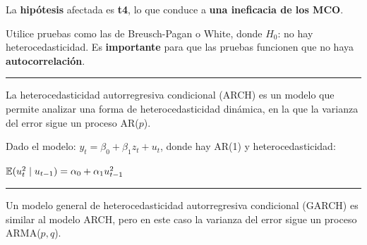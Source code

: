 \begin{f}
	
	La \textbf{hipótesis} afectada es \textbf{t4}, lo que conduce a \textbf{una ineficacia de los MCO}.
	
	Utilice pruebas como las de Breusch-Pagan o White, donde \(H_{0}\): no hay heterocedasticidad. Es \textbf{importante} para que las pruebas funcionen que no haya \textbf{autocorrelación}.
	
\end{f}  \hrule  
\begin{f}[ARCH]
	
	La heterocedasticidad autorregresiva condicional (ARCH) es un modelo que permite analizar una forma de heterocedasticidad dinámica, en la que la varianza del error sigue un proceso AR(\(p\)).
	
	Dado el modelo: \(y_{t} = \beta_{0} + \beta_{1} z_{t} + u_{t}\), donde hay AR(1) y heterocedasticidad:
	
	\begin{center}
		\(\mathbb{E}(u^{2}_{t} \mid u_{t - 1}) = \alpha_{0} + \alpha_{1} u^{2}_{t - 1}\)
	\end{center}
	
\end{f}  \hrule 
\begin{f}[GARCH]
	
	Un modelo general de heterocedasticidad autorregresiva condicional (GARCH) es similar al modelo ARCH, pero en este caso la varianza del error sigue un proceso ARMA(\(p, q\)).
\end{f}